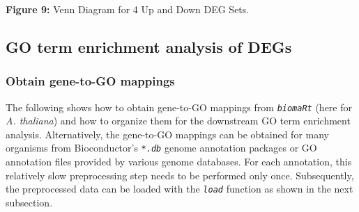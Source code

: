 \documentclass[14pt,]{article}
\begin{document}
\textbf{Figure 9:} Venn Diagram for 4 Up and Down DEG Sets.

\hypertarget{go-term-enrichment-analysis-of-degs}{%
\subsection{GO term enrichment analysis of DEGs}\label{go-term-enrichment-analysis-of-degs}}

\hypertarget{obtain-gene-to-go-mappings}{%
\subsubsection{Obtain gene-to-GO mappings}\label{obtain-gene-to-go-mappings}}

The following shows how to obtain gene-to-GO mappings from \emph{\texttt{biomaRt}} (here for \emph{A. thaliana}) and how to organize them for the downstream GO term enrichment analysis. Alternatively, the gene-to-GO mappings can be obtained for many organisms from Bioconductor's \emph{\texttt{*.db}} genome annotation packages or GO annotation files provided by various genome databases. For each annotation, this relatively slow preprocessing step needs to be performed only once. Subsequently, the preprocessed data can be loaded with the \emph{\texttt{load}} function as shown in the next subsection.
\end{document}
